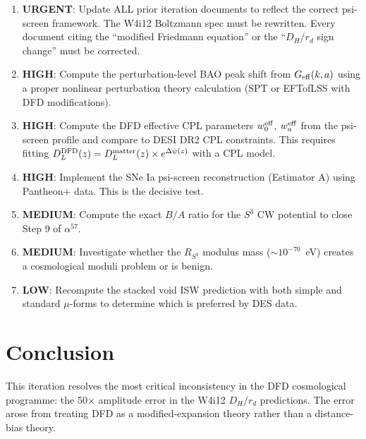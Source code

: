 \documentclass[11pt,a4paper]{article}
\newcommand{\mufd}{\mu}
\newcommand{\Geff}{G_{\rm eff}}
\newcommand{\Dpsi}{\Delta\psi}
\begin{document}
\begin{enumerate}
\item \textbf{URGENT}: Update ALL prior iteration documents to
  reflect the correct psi-screen framework.  The W4i12 Boltzmann
  spec must be rewritten.  Every document citing the ``modified
  Friedmann equation'' or the ``$D_H/r_d$ sign change'' must be
  corrected.

\item \textbf{HIGH}: Compute the perturbation-level BAO peak shift
  from $\Geff(k,a)$ using a proper nonlinear perturbation theory
  calculation (SPT or EFTofLSS with DFD modifications).

\item \textbf{HIGH}: Compute the DFD effective CPL parameters
  $w_0^{\rm eff}$, $w_a^{\rm eff}$ from the psi-screen profile
  and compare to DESI DR2 CPL constraints.  This requires fitting
  $D_L^{\rm DFD}(z) = D_L^{\rm matter}(z) \times e^{\Dpsi(z)}$
  with a CPL model.

\item \textbf{HIGH}: Implement the SNe Ia psi-screen reconstruction
  (Estimator A) using Pantheon+ data.  This is the decisive test.

\item \textbf{MEDIUM}: Compute the exact $B/A$ ratio for the $S^3$
  CW potential to close Step 9 of $\alpha^{57}$.

\item \textbf{MEDIUM}: Investigate whether the $R_{S^3}$ modulus
  mass ($\sim 10^{-70}$~eV) creates a cosmological moduli problem
  or is benign.

\item \textbf{LOW}: Recompute the stacked void ISW prediction
  with both simple and standard $\mufd$-forms to determine which
  is preferred by DES data.
\end{enumerate}


\section{Conclusion}
\label{sec:conclusion}

This iteration resolves the most critical inconsistency in the DFD
cosmological programme: the 50$\times$ amplitude error in the W4i12
$D_H/r_d$ predictions.  The error arose from treating DFD as a
modified-expansion theory rather than a distance-bias theory.
\end{document}
